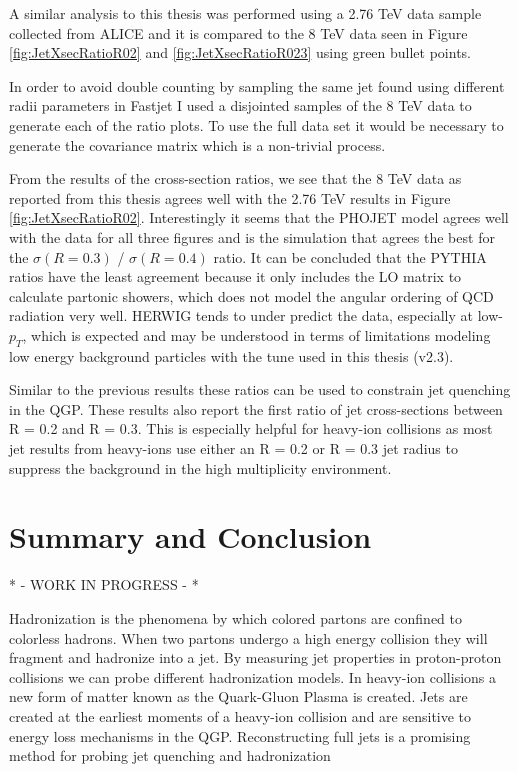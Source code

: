 A similar analysis to this thesis was performed using a 2.76 TeV  data sample collected from ALICE\cite{MA2013319} and it is compared to the 8 TeV data seen in Figure \ref{fig:JetXsecRatioR02} and \ref{fig:JetXsecRatioR023} using green bullet points.  

In order to avoid double counting by sampling the same jet found using different radii parameters in Fastjet I used a disjointed samples of the 8 TeV data to generate each of the ratio plots.  To use the full data set it would be necessary to generate the covariance matrix which is a non-trivial process.   

From the results of the cross-section ratios, we see that the 8 TeV data as reported from this thesis agrees well with the 2.76 TeV results in Figure \ref{fig:JetXsecRatioR02}.  Interestingly it seems that the PHOJET model agrees well with the data for all three figures and is the simulation that agrees the best for the $\sigma (R = 0.3)$ / $\sigma (R = 0.4)$ ratio.  It can be concluded that the PYTHIA ratios have the least agreement because it only includes the LO matrix to calculate partonic showers, which does not model the angular ordering of QCD radiation very well.  HERWIG tends to under predict the data, especially at low-$p_{T}$, which is expected and may be understood in terms of limitations modeling low energy background particles with the tune used in this thesis (v2.3).  

Similar to the previous results these ratios can be used to constrain jet quenching in the QGP.  These results also report the first ratio of jet cross-sections between R = 0.2 and R = 0.3.  This is especially helpful for heavy-ion collisions as most jet results from heavy-ions use either an R = 0.2 or R = 0.3 jet radius to suppress the background in the high multiplicity environment.


\section{Summary and Conclusion}

* - WORK IN PROGRESS - *

Hadronization is the phenomena by which colored partons are confined to colorless hadrons.  When two partons undergo a high energy collision they will fragment and hadronize into a jet.  By measuring jet properties in proton-proton collisions we can probe different hadronization models.  In heavy-ion collisions a new form of matter known as the Quark-Gluon Plasma is created.  Jets are created at the earliest moments of a heavy-ion collision and are sensitive to energy loss mechanisms in the QGP.  Reconstructing full jets is a promising method for probing jet quenching and hadronization

